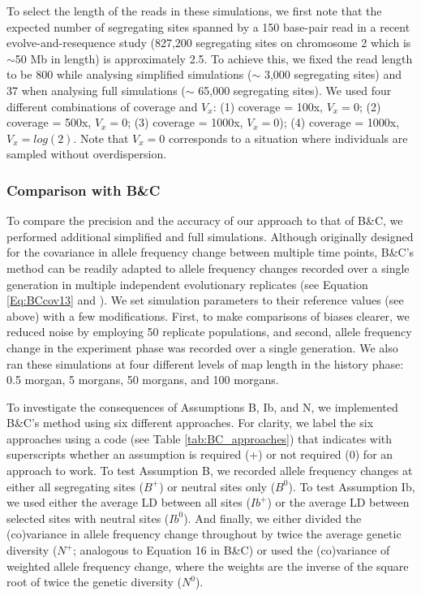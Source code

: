 \documentclass[12pt]{article}
\begin{document}
\begin{bibunit}
To select the length of the reads in these simulations, we first note that the expected number of segregating sites spanned by a 150 base-pair read in a recent evolve-and-resequence study \citep{Bitter.2024} (827,200 segregating sites on chromosome 2 which is $\sim$50 Mb in length) is approximately 2.5. To achieve this, we fixed the read length to be 800 while analysing simplified simulations ($\sim$ 3,000 segregating sites) and 37 when analysing full simulations ($\sim$ 65,000 segregating sites). We used four different combinations of coverage and $V_x$: (1) coverage = 100x, $V_x = 0$; (2) coverage = 500x, $V_x = 0$; (3) coverage = 1000x, $V_x = 0$); (4) coverage = 1000x, $V_x = log(2)$. Note that $V_x = 0$ corresponds to a situation where individuals are sampled without overdispersion.

\subsubsection*{Comparison with B\&C}

To compare the precision and the accuracy of our approach to that of B\&C, we performed additional simplified and full simulations. Although originally designed for the covariance in allele frequency change between multiple time points, B\&C's method can be readily adapted to allele frequency changes recorded over a single generation in multiple independent evolutionary replicates (see Equation \ref{Eq:BCcov13} and \citet{Buffalo.2020}). We set simulation parameters to their reference values (see above) with a few modifications. First, to make comparisons of biases clearer, we reduced noise by employing 50 replicate populations, and second, allele frequency change in the experiment phase was recorded over a single generation. We also ran these simulations at four different levels of map length in the history phase: 0.5 morgan, 5 morgans, 50 morgans, and 100 morgans.

To investigate the consequences of Assumptions B, Ib, and N, we implemented B\&C's method using six different approaches. For clarity, we label the six approaches using a code (see Table \ref{tab:BC_approaches}) that indicates with superscripts whether an assumption is required (+) or not required (0) for an approach to work. To test Assumption B, we recorded allele frequency changes at either all segregating sites ($B^+$) or neutral sites only ($B^0$). To test Assumption Ib, we used either the average LD between all sites ($Ib^+$) or the average LD between selected sites with neutral sites ($Ib^0$). And finally, we either divided the (co)variance in allele frequency change throughout by twice the average genetic diversity ($N^+$; analogous to Equation 16 in B\&C) or used the (co)variance of weighted allele frequency change, where the weights are the inverse of the square root of twice the genetic diversity ($N^0$).  


\end{bibunit}
\end{document}
